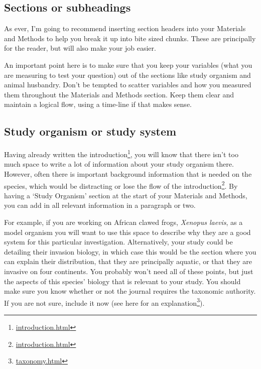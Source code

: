 \documentclass[
]{krantz}
\renewcommand{\href}[2]{#2\footnote{\url{#1}}}
\begin{document}
\hypertarget{sections-or-subheadings}{%
\subsection{Sections or subheadings}\label{sections-or-subheadings}}

As ever, I'm going to recommend inserting section headers into your Materials and Methods to help you break it up into bite sized chunks. These are principally for the reader, but will also make your job easier.

An important point here is to make sure that you keep your variables (what you are measuring to test your question) out of the sections like study organism and animal husbandry. Don't be tempted to scatter variables and how you measured them throughout the Materials and Methods section. Keep them clear and maintain a logical flow, using a time-line if that makes sense.

\hypertarget{study-organism-or-study-system}{%
\subsection{Study organism or study system}\label{study-organism-or-study-system}}

Having already written the \href{introduction.html}{introduction}, you will know that there isn't too much space to write a lot of information about your study organism there. However, often there is important background information that is needed on the species, which would be distracting or lose the flow of the \href{introduction.html}{introduction}. By having a `Study Organism' section at the start of your Materials and Methods, you can add in all relevant information in a paragraph or two.

For example, if you are working on African clawed frogs, \emph{Xenopus laevis}, as a model organism you will want to use this space to describe why they are a good system for this particular investigation. Alternatively, your study could be detailing their invasion biology, in which case this would be the section where you can explain their distribution, that they are principally aquatic, or that they are invasive on four continents. You probably won't need all of these points, but just the aspects of this species' biology that is relevant to your study. You should make sure you know whether or not the journal requires the taxonomic authority. If you are not sure, include it now (\href{taxonomy.html}{see here for an explanation}).
\end{document}
